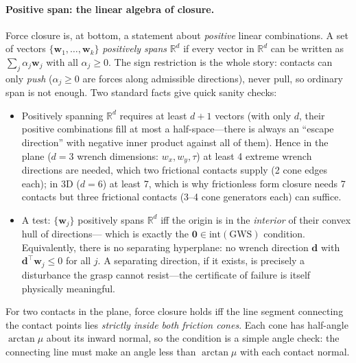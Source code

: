 \documentclass[11pt,twoside]{report}
\theoremstyle{definition}
\theoremstyle{plain}
\theoremstyle{remark}
\newcommand{\R}{\mathbb{R}}
\newcommand{\0}{\bm{0}}
\begin{document}
\paragraph{Positive span: the linear algebra of closure.}
Force closure is, at bottom, a statement about \emph{positive} linear
combinations. A set of vectors $\{\bm{w}_{1},\ldots,\bm{w}_{k}\}$
\emph{positively spans} $\R^{d}$ if every vector in $\R^{d}$ can be
written as $\sum_{j}\alpha_{j}\bm{w}_{j}$ with all $\alpha_{j}\ge 0$.
The sign restriction is the whole story: contacts can only \emph{push}
($\alpha_{j}\ge 0$ are forces along admissible directions), never pull,
so ordinary span is not enough. Two standard facts give quick sanity
checks:
\begin{itemize}
\item Positively spanning $\R^{d}$ requires at least $d+1$ vectors
      (with only $d$, their positive combinations fill at most a
      half-space---there is always an ``escape direction'' with negative
      inner product against all of them). Hence in the plane
      ($d=3$ wrench dimensions: $w_{x},w_{y},\tau$) at least 4 extreme
      wrench directions are needed, which two frictional contacts
      supply (2 cone edges each); in 3D ($d=6$) at least 7, which is
      why frictionless form closure needs 7 contacts but three
      frictional contacts (3--4 cone generators each) can suffice.
\item A test: $\{\bm{w}_{j}\}$ positively spans $\R^{d}$ iff the origin
      is in the \emph{interior} of their convex hull of directions---%
      which is exactly the $\0\in\text{int}(\text{GWS})$ condition.
      Equivalently, there is no separating hyperplane: no wrench
      direction $\bm{d}$ with $\bm{d}^{\!\top}\bm{w}_{j}\le 0$ for all
      $j$. A separating direction, if it exists, is precisely a
      disturbance the grasp cannot resist---the certificate of failure
      is itself physically meaningful.
\end{itemize}

\begin{definitionbox}
For two contacts in the plane, force closure holds iff the line segment
connecting the contact points lies \emph{strictly inside both friction
cones}. Each cone has half-angle $\arctan\mu$ about its inward normal,
so the condition is a simple angle check: the connecting line must make
an angle less than $\arctan\mu$ with each contact normal.
\end{definitionbox}
\end{document}
